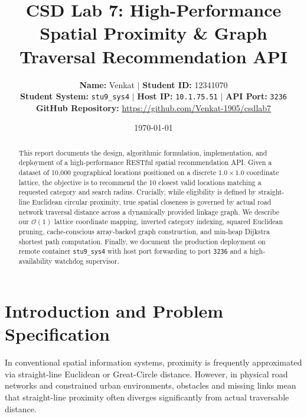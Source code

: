\documentclass[11pt,a4paper]{article}
\title{\textbf{CSD Lab 7: High-Performance Spatial Proximity \& Graph Traversal Recommendation API}}
\author{\textbf{Name:} Venkat \quad $\vert$ \quad \textbf{Student ID:} 12341070 \\
\textbf{Student System:} \texttt{stu9\_sys4} \quad $\vert$ \quad \textbf{Host IP:} \texttt{10.1.75.51} \quad $\vert$ \quad \textbf{API Port:} \texttt{3236} \\
\textbf{GitHub Repository:} \url{https://github.com/Venkat-1905/csdlab7}}
\date{\today}
\begin{document}
\maketitle

\begin{abstract}
This report documents the design, algorithmic formulation, implementation, and deployment of a high-performance RESTful spatial recommendation API. Given a dataset of 10,000 geographical locations positioned on a discrete $1.0 \times 1.0$ coordinate lattice, the objective is to recommend the 10 closest valid locations matching a requested category and search radius. Crucially, while eligibility is defined by straight-line Euclidean circular proximity, true spatial closeness is governed by actual road network traversal distance across a dynamically provided linkage graph. We describe our $\mathcal{O}(1)$ lattice coordinate mapping, inverted category indexing, squared Euclidean pruning, cache-conscious array-backed graph construction, and min-heap Dijkstra shortest path computation. Finally, we document the production deployment on remote container \texttt{stu9\_sys4} with host port forwarding to port \texttt{3236} and a high-availability watchdog supervisor.
\end{abstract}

\section{Introduction and Problem Specification}

In conventional spatial information systems, proximity is frequently approximated via straight-line Euclidean or Great-Circle distance. However, in physical road networks and constrained urban environments, obstacles and missing links mean that straight-line proximity often diverges significantly from actual traversable distance.
\end{document}
